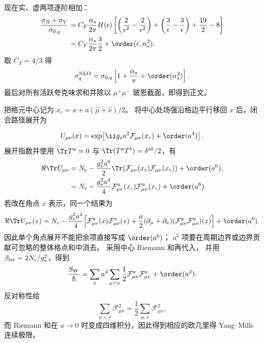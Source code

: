 \begin{derivation}[强子产生率中的实虚抵消]
现在实、虚两项逐阶相加：
\begin{align*}
 \frac{\sigma_R+\sigma_V}{\sigma_{0,q}}
 &=C_F\frac{\alpha_s}{2\pi}H(\epsilon)
 \left[
 \left(\frac2{\epsilon^2}-\frac2{\epsilon^2}\right)
 +\left(\frac3\epsilon-\frac3\epsilon\right)
 +\frac{19}{2}-8\right]\\
 &=C_F\frac{\alpha_s}{2\pi}\frac32+\order(\epsilon,\alpha_s^2).
\end{align*}
取 $C_F=4/3$ 得
\begin{equation*}
 \sigma_q^{\rm NLO}
 =\sigma_{0,q}\left[1+\frac{\alpha_s}{\pi}+\order(\alpha_s^2)\right].
\end{equation*}
最后对所有活跃夸克味求和并除以 $\mu^+\mu^-$ 玻恩截面，即得到正文。
\end{derivation}

\begin{derivation}[格点规范作用量的连续极限]
把格元中心记为 $x_c=x+a(\hat\mu+\hat\nu)/2$。
将中心处场强沿格边平行移回 $x$ 后，闭合路径展开为

\begin{equation*}
 U_{\mu\nu}(x)
 =\exp\!\left[\ii g_sa^2\mathcal F_{\mu\nu}(x_c)+\order(a^4)\right].
\end{equation*}
展开指数并使用 $\Tr T^a=0$ 与 $\Tr(T^aT^b)=\delta^{ab}/2$，有
\begin{align*}
 \Re\Tr U_{\mu\nu}
 &=N_c-
 \frac{g_s^2a^4}{2}
 \Tr\!\left(\mathcal F_{\mu\nu}(x_c)\mathcal F_{\mu\nu}(x_c)\right)
 +\order(a^6),\\
 &=N_c-
 \frac{g_s^2a^4}{4}
 \mathcal F_{\mu\nu}^a(x_c)\mathcal F_{\mu\nu}^a(x_c)
 +\order(a^6).
\end{align*}
若改在角点 $x$ 表示，同一个结果为
\begin{align*}
\Re\Tr U_{\mu\nu}(x)
=N_c-\frac{g_s^2a^4}{4}\Big[
\mathcal F_{\mu\nu}^a(x)\mathcal F_{\mu\nu}^a(x)
+\frac a2(\partial_\mu+\partial_\nu)
(\mathcal F_{\mu\nu}^a\mathcal F_{\mu\nu}^a)(x)\Big]
+\order(a^6).
\end{align*}
因此单个角点展开不能把余项直接写成 $\order(a^6)$；
$a^5$ 项要在周期边界或边界贡献可忽略的整体格点和中消去。
采用中心 Riemann 和再代入，
并用 $\beta_{\rm lat}=2N_c/g_s^2$，得到
\begin{equation*}
 \frac{S_W}{\hbar}
 =\sum_xa^4\sum_{\mu<\nu}
 \frac12\mathcal F_{\mu\nu}^a\mathcal F_{\mu\nu}^a
 +\order(a^2).
\end{equation*}
反对称性给
\begin{equation*}
 \sum_{\mu<\nu}\mathcal F_{\mu\nu}^2
 =\frac12\sum_{\mu,\nu}\mathcal F_{\mu\nu}^2,
\end{equation*}
而 Riemann 和在 $a\to0$ 时变成四维积分，因此得到相应的欧几里得 Yang--Mills 连续极限。
\end{derivation}

